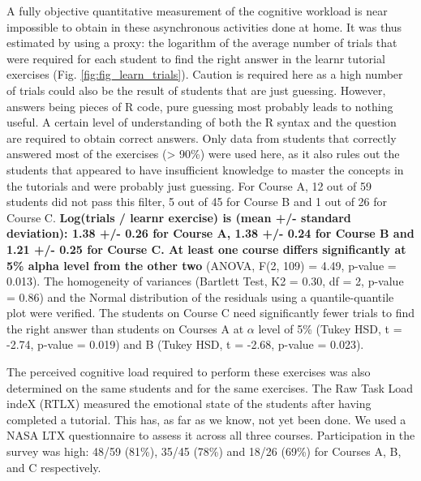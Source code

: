 \documentclass{aims}
\theoremstyle{definition}
\begin{document}
A fully objective quantitative measurement of the cognitive workload is
near impossible to obtain in these asynchronous activities done at home.
It was thus estimated by using a proxy: the logarithm of the average
number of trials that were required for each student to find the right
answer in the learnr tutorial exercises (Fig.
\ref {fig:fig_learn_trials}). Caution is required here as a high number
of trials could also be the result of students that are just guessing.
However, answers being pieces of R code, pure guessing most probably
leads to nothing useful. A certain level of understanding of both the R
syntax and the question are required to obtain correct answers. Only
data from students that correctly answered most of the exercises
(\textgreater{} 90\%) were used here, as it also rules out the students
that appeared to have insufficient knowledge to master the concepts in
the tutorials and were probably just guessing. For Course A, 12 out of
59 students did not pass this filter, 5 out of 45 for Course B and 1 out
of 26 for Course C. \textbf{Log(trials / learnr exercise) is (mean +/-
standard deviation): 1.38 +/- 0.26 for Course A, 1.38 +/- 0.24 for
Course B and 1.21 +/- 0.25 for Course C. At least one course differs
significantly at 5\% alpha level from the other two} (ANOVA, F(2, 109) =
4.49, p-value = 0.013). The homogeneity of variances (Bartlett Test, K2
= 0.30, df = 2, p-value = 0.86) and the Normal distribution of the
residuals using a quantile-quantile plot were verified. The students on
Course C need significantly fewer trials to find the right answer than
students on Courses A at \(\alpha\) level of 5\% (Tukey HSD, t = -2.74,
p-value = 0.019) and B (Tukey HSD, t = -2.68, p-value = 0.023).

The perceived cognitive load required to perform these exercises was
also determined on the same students and for the same exercises. The Raw
Task Load indeX (RTLX) measured the emotional state of the students
after having completed a tutorial. This has, as far as we know, not yet
been done. We used a NASA LTX questionnaire to assess it across all
three courses. Participation in the survey was high: 48/59 (81\%), 35/45
(78\%) and 18/26 (69\%) for Courses A, B, and C respectively.
\end{document}
